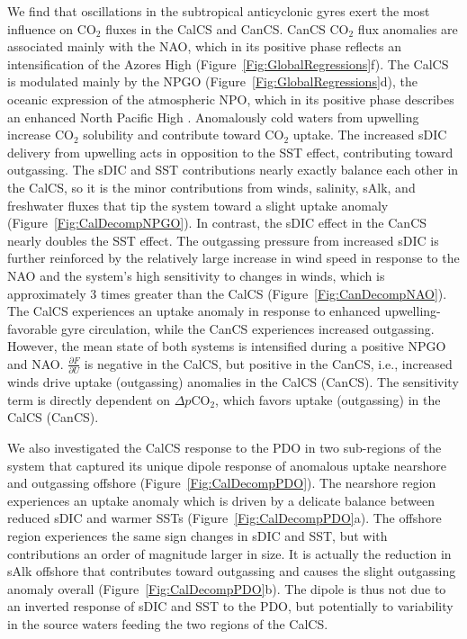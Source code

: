 \documentclass[hvmath, online,bgd]{copernicus_discussions}
\begin{document}
We find that oscillations in the subtropical anticyclonic gyres exert the most influence on CO$_{2}$ fluxes in the CalCS and CanCS. CanCS CO$_{2}$ flux anomalies are associated mainly with the NAO, which in its positive phase reflects an intensification of the Azores High (Figure~\ref{Fig:GlobalRegressions}f). The CalCS is modulated mainly by the NPGO (Figure~\ref{Fig:GlobalRegressions}d), the oceanic expression of the atmospheric NPO, which in its positive phase describes an enhanced North Pacific High \citep{DiLorenzo:2008}. Anomalously cold waters from upwelling increase CO$_{2}$ solubility and contribute toward CO$_{2}$ uptake. The increased sDIC delivery from upwelling acts in opposition to the SST effect, contributing toward outgassing. The sDIC and SST contributions nearly exactly balance each other in the CalCS, so it is the minor contributions from winds, salinity, sAlk, and freshwater fluxes that tip the system toward a slight uptake anomaly (Figure~\ref{Fig:CalDecompNPGO}). In contrast, the sDIC effect in the CanCS nearly doubles the SST effect. The outgassing pressure from increased sDIC is further reinforced by the relatively large increase in wind speed in response to the NAO and the system's high sensitivity to changes in winds, which is approximately 3 times greater than the CalCS (Figure~\ref{Fig:CanDecompNAO}). The CalCS experiences an uptake anomaly in response to enhanced upwelling-favorable gyre circulation, while the CanCS experiences increased outgassing. However, the mean state of both systems is intensified during a positive NPGO and NAO. $\frac{\partial F}{\partial U}$ is negative in the CalCS, but positive in the CanCS, i.e., increased winds drive uptake (outgassing) anomalies in the CalCS (CanCS). The sensitivity term is directly dependent on $\Delta p\mathrm{CO}_{2}$, which favors uptake (outgassing) in the CalCS (CanCS).

We also investigated the CalCS response to the PDO in two sub-regions of the system that captured its unique dipole response of anomalous uptake nearshore and outgassing offshore (Figure~\ref{Fig:CalDecompPDO}). The nearshore region experiences an uptake anomaly which is driven by a delicate balance between reduced sDIC and warmer SSTs (Figure~\ref{Fig:CalDecompPDO}a). The offshore region experiences the same sign changes in sDIC and SST, but with contributions an order of magnitude larger in size. It is actually the reduction in sAlk offshore that contributes toward outgassing and causes the slight outgassing anomaly overall (Figure~\ref{Fig:CalDecompPDO}b). The dipole is thus not due to an inverted response of sDIC and SST to the PDO, but potentially to variability in the source waters feeding the two regions of the CalCS.
\end{document}
